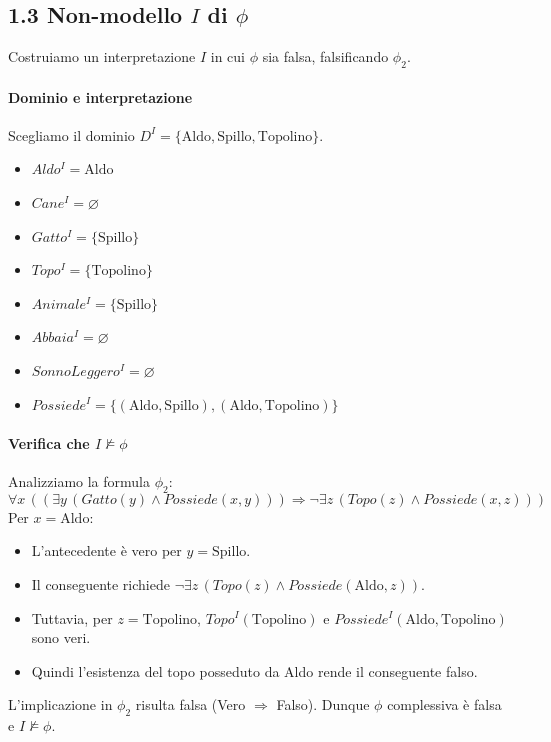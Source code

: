 \documentclass[a4paper,11pt]{article}
\begin{document}
\newpage

\subsection*{1.3 Non-modello $I$ di $\phi$}

Costruiamo un interpretazione $I$ in cui $\phi$ sia falsa, falsificando $\phi_2$.

\paragraph{Dominio e interpretazione}
Scegliamo il dominio $D^I = \{\mathrm{Aldo}, \mathrm{Spillo}, \mathrm{Topolino}\}$.
\begin{itemize}
  \item $Aldo^I = \mathrm{Aldo}$
  \item $Cane^I = \varnothing$
  \item $Gatto^I = \{\mathrm{Spillo}\}$
  \item $Topo^I = \{\mathrm{Topolino}\}$
  \item $Animale^I = \{\mathrm{Spillo}\}$
  \item $Abbaia^I = \varnothing$
  \item $SonnoLeggero^I = \varnothing$
  \item $Possiede^I = \{(\mathrm{Aldo}, \mathrm{Spillo}), (\mathrm{Aldo}, \mathrm{Topolino})\}$
\end{itemize}

\paragraph{Verifica che $I \not\models \phi$}
Analizziamo la formula $\phi_2$:
\[
\forall x \, ((\exists y \, (Gatto(y) \land Possiede(x, y))) \Rightarrow \neg \exists z \, (Topo(z) \land Possiede(x, z)))
\]
Per $x = \mathrm{Aldo}$:
\begin{itemize}
    \item L'antecedente è vero per $y = \mathrm{Spillo}$.
    \item Il conseguente richiede $\neg \exists z \, (Topo(z) \land Possiede(\mathrm{Aldo}, z))$.
    \item Tuttavia, per $z = \mathrm{Topolino}$, $Topo^I(\mathrm{Topolino})$ e $Possiede^I(\mathrm{Aldo}, \mathrm{Topolino})$ sono veri.
    \item Quindi l'esistenza del topo posseduto da Aldo rende il conseguente falso.
\end{itemize}
L'implicazione in $\phi_2$ risulta falsa (Vero $\Rightarrow$ Falso). Dunque $\phi$ complessiva è falsa e $I \not\models \phi$.
\end{document}
